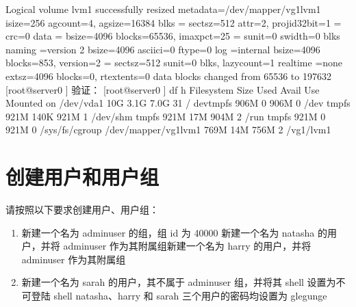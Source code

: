 \documentclass[letterpaper,10pt,english]{sphinxmanual}
\begin{document}
\begin{sphinxVerbatim}[commandchars=\\\{\}]
Logical volume lvm1 successfully resized meta\PYGZhy{}data=/dev/mapper/vg1\PYGZhy{}lvm1     isize=256       agcount=4, agsize=16384 blks
    =       sectsz=512      attr=2, projid32bit=1
    =       crc=0
data        =       bsize=4096      blocks=65536, imaxpct=25
    =       sunit=0 swidth=0 blks
naming      =version 2      bsize=4096      ascii\PYGZhy{}ci=0 ftype=0 log  =internal       bsize=4096      blocks=853, version=2
=   sectsz=512      sunit=0 blks, lazy\PYGZhy{}count=1 realtime =none       extsz=4096      blocks=0, rtextents=0
data blocks changed from 65536 to 197632
[root@server0 \PYGZti{}]\PYGZsh{}
验证：
[root@server0 \PYGZti{}]\PYGZsh{} df \PYGZhy{}h
Filesystem  Size    Used Avail Use\PYGZpc{} Mounted on
/dev/vda1 10G 3.1G 7.0G 31\PYGZpc{} / devtmpfs 906M 0 906M 0\PYGZpc{} /dev tmpfs 921M 140K 921M 1\PYGZpc{} /dev/shm tmpfs   921M    17M     904M    2\PYGZpc{} /run tmpfs   921M    0       921M    0\PYGZpc{} /sys/fs/cgroup
/dev/mapper/vg1\PYGZhy{}lvm1        769M    14M     756M    2\PYGZpc{} /vg1/lvm1
\end{sphinxVerbatim}


\section{创建用户和用户组}
\label{\detokenize{rhcsa/rhcsa_7:id2}}
请按照以下要求创建用户、用户组：
\begin{enumerate}
\item {} 
新建一个名为 adminuser 的组，组 id 为 40000 新建一个名为 natasha 的用户，并将 adminuser 作为其附属组新建一个名为 harry 的用户，并将 adminuser 作为其附属组

\item {} 
新建一个名为 sarah 的用户，其不属于 adminuser 组，并将其 shell 设置为不可登陆 shell natasha、harry 和 sarah 三个用户的密码均设置为 glegunge

\end{enumerate}
\end{document}
